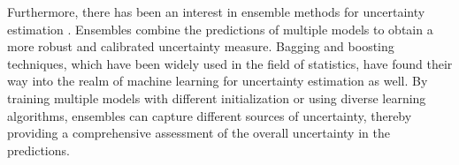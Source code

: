 Furthermore, there has been an interest in ensemble methods for uncertainty estimation \cite{lakshminarayanan_simple_2017}. Ensembles combine the predictions of multiple models to obtain a more robust and calibrated uncertainty measure. Bagging and boosting techniques, which have been widely used in the field of statistics, have found their way into the realm of machine learning for uncertainty estimation as well. By training multiple models with different initialization or using diverse learning algorithms, ensembles can capture different sources of uncertainty, thereby providing a comprehensive assessment of the overall uncertainty in the predictions.










